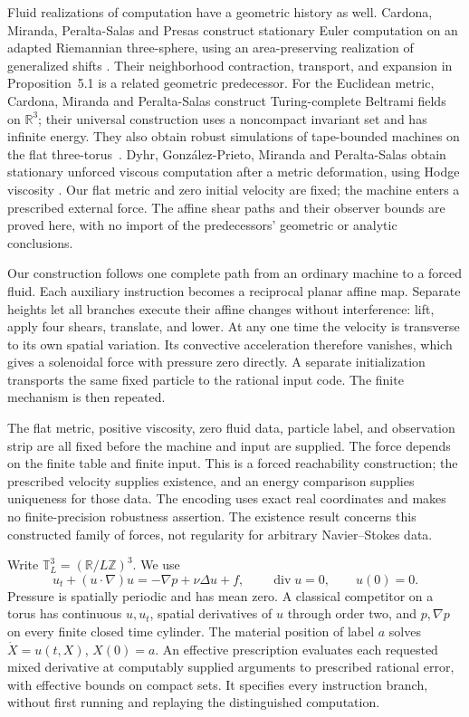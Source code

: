\documentclass[11pt]{article}
\theoremstyle{remark}
\newcommand{\T}{\mathbb T}
\newcommand{\Z}{\mathbb Z}
\newcommand{\R}{\mathbb R}
\newcommand{\divg}{\operatorname{div}}
\begin{document}
Fluid realizations of computation have a geometric history as well.
Cardona, Miranda, Peralta-Salas and Presas construct stationary Euler
computation on an adapted Riemannian three-sphere, using an area-preserving
realization of generalized shifts \cite{CMPP}. Their neighborhood contraction,
transport, and expansion in Proposition~5.1 is a related geometric predecessor.
For the Euclidean metric, Cardona, Miranda and Peralta-Salas construct
Turing-complete Beltrami fields on $\R^3$; their universal construction uses
a noncompact invariant set and has infinite energy. They also obtain robust
simulations of tape-bounded machines on the flat three-torus~\cite{CMP}.
Dyhr, Gonz\'alez-Prieto, Miranda and Peralta-Salas obtain stationary unforced
viscous computation after a metric deformation, using Hodge viscosity
\cite{DGMP}. Our flat metric and zero initial velocity are fixed; the machine
enters a prescribed external force. The affine shear paths and their
observer bounds are proved here, with no import of the predecessors'
geometric or analytic conclusions.

Our construction follows one complete path from an ordinary machine to a
forced fluid. Each auxiliary instruction becomes a reciprocal planar affine
map. Separate heights let all branches execute their affine changes without
interference: lift, apply four shears, translate, and lower. At any one time
the velocity is transverse to its own spatial variation. Its convective
acceleration therefore vanishes, which gives a solenoidal force with pressure
zero directly. A separate initialization transports the same fixed particle
to the rational input code. The finite mechanism is then repeated.

The flat metric, positive viscosity, zero fluid data, particle label, and
observation strip are all fixed before the machine and input are supplied.
The force depends on the finite table and finite input. This is a forced
reachability construction; the prescribed velocity supplies existence, and
an energy comparison supplies uniqueness for those data. The encoding uses
exact real coordinates and makes no finite-precision robustness assertion.
The existence result concerns this constructed family of forces, not
regularity for arbitrary Navier--Stokes data.

Write $\T_L^3=(\R/L\Z)^3$. We use
\begin{equation}\label{eq:NS}
 u_t+(u\cdot\nabla)u=-\nabla p+\nu\Delta u+f,
 \qquad \divg u=0,\qquad u(0)=0.
\end{equation}
Pressure is spatially periodic and has mean zero. A classical competitor on
a torus has continuous $u,u_t$, spatial derivatives of $u$ through order two,
and $p,\nabla p$ on every finite closed time cylinder. The material position
of label $a$ solves $\dot X=u(t,X)$, $X(0)=a$.
An effective prescription evaluates each requested mixed derivative at
computably supplied arguments to prescribed rational error, with effective
bounds on compact sets. It specifies every instruction branch, without first
running and replaying the distinguished computation.
\end{document}

